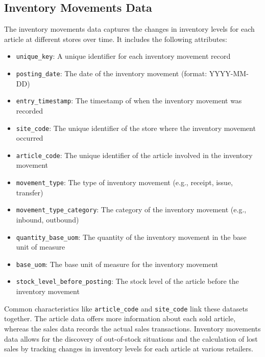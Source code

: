 \documentclass{article}
\begin{document}
\subsection{Inventory Movements Data}
The inventory movements data captures the changes in inventory levels for each article at different stores over time. It includes the following attributes:
\begin{itemize}
  \item \texttt{unique\_key}: A unique identifier for each inventory movement record
  \item \texttt{posting\_date}: The date of the inventory movement (format: YYYY-MM-DD)
  \item \texttt{entry\_timestamp}: The timestamp of when the inventory movement was recorded
  \item \texttt{site\_code}: The unique identifier of the store where the inventory movement occurred
  \item \texttt{article\_code}: The unique identifier of the article involved in the inventory movement
  \item \texttt{movement\_type}: The type of inventory movement (e.g., receipt, issue, transfer)
  \item \texttt{movement\_type\_category}: The category of the inventory movement (e.g., inbound, outbound)
  \item \texttt{quantity\_base\_uom}: The quantity of the inventory movement in the base unit of measure
  \item \texttt{base\_uom}: The base unit of measure for the inventory movement
  \item \texttt{stock\_level\_before\_posting}: The stock level of the article before the inventory movement
\end{itemize}

Common characteristics like \texttt{article\_code} and \texttt{site\_code} link these datasets together. The article data offers more information about each sold article, whereas the sales data records the actual sales transactions. Inventory movements data allows for the discovery of out-of-stock situations and the calculation of lost sales by tracking changes in inventory levels for each article at various retailers.
\end{document}
